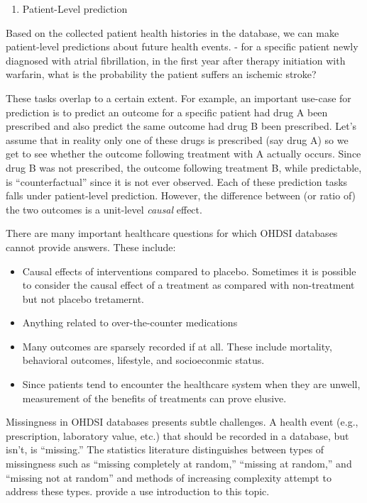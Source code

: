 \documentclass[]{book}
\providecommand{\tightlist}{%
  \setlength{\itemsep}{0pt}\setlength{\parskip}{0pt}}
\begin{document}
\begin{enumerate}
\def\labelenumi{\arabic{enumi}.}
\setcounter{enumi}{2}
\tightlist
\item
  Patient-Level prediction
\end{enumerate}

Based on the collected patient health histories in the database, we can
make patient-level predictions about future health events. - for a
specific patient newly diagnosed with atrial fibrillation, in the first
year after therapy initiation with warfarin, what is the probability the
patient suffers an ischemic stroke?

These tasks overlap to a certain extent. For example, an important
use-case for prediction is to predict an outcome for a specific patient
had drug A been prescribed and also predict the same outcome had drug B
been prescribed. Let's assume that in reality only one of these drugs is
prescribed (say drug A) so we get to see whether the outcome following
treatment with A actually occurs. Since drug B was not prescribed, the
outcome following treatment B, while predictable, is ``counterfactual''
since it is not ever observed. Each of these prediction tasks falls
under patient-level prediction. However, the difference between (or
ratio of) the two outcomes is a unit-level \emph{causal} effect.

There are many important healthcare questions for which OHDSI databases
cannot provide answers. These include:

\begin{itemize}
\tightlist
\item
  Causal effects of interventions compared to placebo. Sometimes it is
  possible to consider the causal effect of a treatment as compared with
  non-treatment but not placebo tretamernt.
\item
  Anything related to over-the-counter medications
\item
  Many outcomes are sparsely recorded if at all. These include
  mortality, behavioral outcomes, lifestyle, and socioeconmic status.
\item
  Since patients tend to encounter the healthcare system when they are
  unwell, measurement of the benefits of treatments can prove elusive.
\end{itemize}

Missingness in OHDSI databases presents subtle challenges. A health
event (e.g., prescription, laboratory value, etc.) that should be
recorded in a database, but isn't, is ``missing.'' The statistics
literature distinguishes between types of missingness such as ``missing
completely at random,'' ``missing at random,'' and ``missing not at
random'' and methods of increasing complexity attempt to address these
types. \citet{perkins2017principled} provide a use introduction to this
topic.
\end{document}
